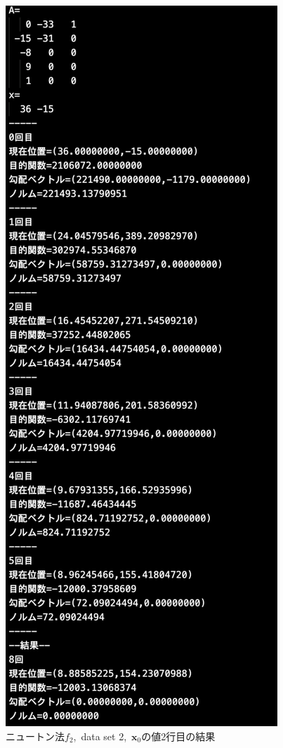 \documentclass[12pt]{jarticle}
\begin{document}
\clearpage

\begin{figure}[h]
    \begin{center}
        \includegraphics[scale=0.3]{kadai1_2n_out2_2_1.png}
    \end{center}
    \caption{ニュートン法$f_2$,\ data set 2,\ $\boldsymbol{x}_0$の値2行目の結果}
\end{figure}
\end{document}
